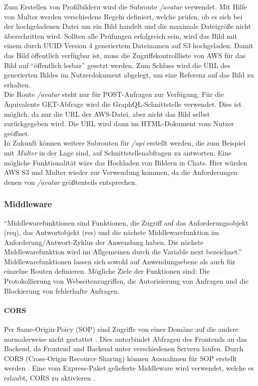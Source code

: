 Zum Erstellen von Profilbildern wird die Subroute \textit{/avatar} verwendet.
Mit Hilfe von Multer werden verschiedene Regeln definiert, welche prüfen, ob es sich bei der hochgeladenen Datei um ein Bild handelt und die maximale Dateigröße nicht überschritten wird.
Sollten alle Prüfungen erfolgreich sein, wird das Bild mit einem durch UUID Version 4 generiertem Dateinamen auf S3 hochgeladen.
Damit das Bild öffentlich verfügbar ist, muss die Zugriffskontrollliste von AWS für das Bild auf \enquote{öffentlich lesbar} gesetzt werden.
Zum Schluss wird die URL des generierten Bildes im Nutzerdokument abgelegt, um eine Referenz auf das Bild zu erhalten.\\

Die Route \textit{/avatar} steht nur für POST-Anfragen zur Verfügung.
Für die Äquivalente GET-Abfrage wird die GraphQL-Schnittstelle verwendet.
Dies ist möglich, da nur die URL der AWS-Datei, aber nicht das Bild selbst zurückgegeben wird.
Die URL wird dann im HTML-Dokument vom Nutzer geöffnet.\\

In Zukunft können weitere Subrouten für \textit{/api} erstellt werden, die zum Beispiel mit \textit{Multer} in der Lage sind, auf Schnittstellenabfragen zu antworten.
Eine mögliche Funktionalität wäre das Hochladen von Bildern in Chats.
Hier würden AWS S3 und Multer wieder zur Verwendung kommen, da die Anforderungen denen von \textit{/avatar} größtenteils entsprechen.

\subsubsection{Middleware}
\enquote{Middlewarefunktionen sind Funktionen, die Zugriff auf das Anforderungsobjekt (req), das Antwortobjekt (res) und die nächste Middlewarefunktion im Anforderung/Antwort-Zyklus der Anwendung haben. Die nächste Middlewarefunktion wird im Allgemeinen durch die Variable next bezeichnet.}\cite{be:expressMiddlewareQuote}
Middlewarefunktionen lassen sich sowohl auf Anwendungsebene als auch für einzelne Routen definieren.
Mögliche Ziele der Funktionen sind: Die Protokollierung von Webseitenzugriffen, die Autorisierung von Anfragen und die Blockierung von fehlerhafte Anfragen.

\paragraph{CORS\\}
Per Same-Origin-Poicy (SOP) sind Zugriffe von einer Domäne auf die andere normalerweise nicht gestattet \cite{be:mdnSop}.
Dies unterbindet Abfragen des Frontends an das Backend, da Frontend und Backend unter verschiedenen Servern laufen.
Durch CORS (Cross-Origin Recource Sharing) können Ausnahmen für SOP erstellt werden \cite{be:mdnCors}.
Eine vom Express-Paket gelieferte Middleware wird verwendet, welche es erlaubt, CORS zu aktivieren \cite{be:expressMiddlewareCors}.

